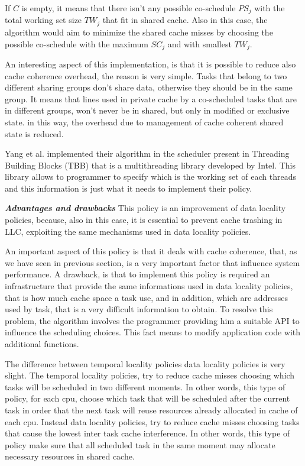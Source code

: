 \begin{description}
If $C$ is empty, it means that there isn't any possible co-schedule $PS_j$ with the total working set size $TW_j$ that fit in shared cache. Also in this 
case, the algorithm would aim to minimize the shared cache misses by choosing the possible co-schedule with the maximum $SC_j$ and with smallest $TW_j$.

An interesting aspect of this implementation, is that it is possible to reduce also cache coherence overhead, the reason is very simple. Tasks that belong 
to two different sharing groups don't share data, otherwise they should be in the same group. It means that lines used in private cache by
a co-scheduled tasks that are in different groups, won't never be in shared, but
only in modified or exclusive state. in this way, the overhead due to 
management of cache coherent shared state is reduced. 

Yang et al. implemented their algorithm in the scheduler present in Threading Building Blocks (TBB) that is a multithreading library developed by Intel. 
This library allows to programmer to specify which is the working set of each threads and this information is just what it needs to implement their policy. 


\textbf{\textit{Advantages and drawbacks}}
This policy is an improvement of data locality policies, because, also in this case, it is essential to prevent cache trashing in LLC,
exploiting the same mechanisms used in data locality policies.

An important aspect of this policy is that it deals with cache coherence, that, as we have seen in previous section, is a very important factor that 
influence system performance. A drawback, is that to implement this policy is required an infrastructure that provide the same informations used in 
data locality policies, that is how much cache space a task use, and in addition, which are addresses used by task, that is a very difficult information
to obtain. To resolve this problem, the algorithm involves the programmer providing him a suitable API to influence the scheduling choices. This fact 
means to modify application code with additional functions. 
\end{description}

The difference between temporal locality policies data locality policies is very slight. The temporal locality policies, try to reduce cache misses 
choosing which tasks will be scheduled in two different moments. In other words, this type of policy, for each cpu, choose which task that will be 
scheduled after the current task in order that the next task will reuse resources already allocated in cache of each cpu. Instead data locality policies, 
try to reduce cache misses choosing tasks that cause the lowest inter task cache interference. In other words, this type of policy make sure that all 
scheduled task in the same moment may allocate necessary resources in shared cache.

